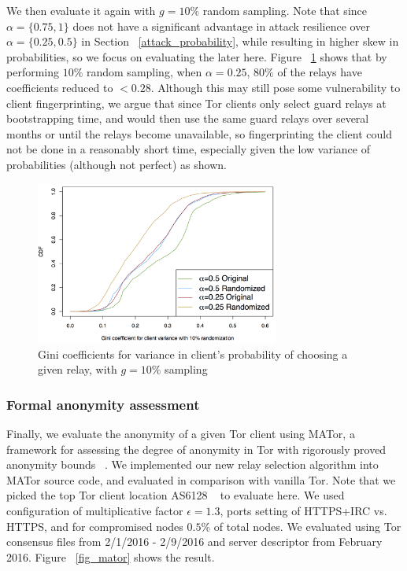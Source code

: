 We then evaluate it again with $g=10\%$ random sampling. Note that since $\alpha=\{0.75,1\}$ does not have a significant advantage in attack resilience over $\alpha=\{0.25,0.5\}$ in Section ~\ref{attack_probability}, while resulting in higher skew in probabilities, so we focus on evaluating the later here. Figure ~\ref{fig_gini_client_random} shows that by performing $10\%$ random sampling, when $\alpha=0.25$, $80\%$ of the relays have coefficients reduced to $< 0.28$. Although this may still pose some vulnerability to client fingerprinting, we argue that since Tor clients only select guard relays at bootstrapping time, and would then use the same guard relays over several months or until the relays become unavailable, so fingerprinting the client could not be done in a reasonably short time, especially given the low variance of probabilities (although not perfect) as shown.

\begin{figure}[ht!]
\centering
\includegraphics[width=80mm]{figure/randomize_client_gini}
\caption{Gini coefficients for variance in client's probability of choosing a given relay, with $g=10\%$ sampling \label{fig_gini_client_random}}
\end{figure}

\subsubsection{Formal anonymity assessment}
Finally, we evaluate the anonymity of a given Tor client using MATor, a framework for assessing the degree of anonymity in Tor with rigorously proved anonymity bounds ~\cite{backes2014nothing}. We implemented our new relay selection algorithm into MATor source code, and evaluated in comparison with vanilla Tor. Note that we picked the top Tor client location AS6128 ~\cite{juen2012protecting} to evaluate here. We used configuration of multiplicative factor $\epsilon=1.3$, ports setting of HTTPS+IRC vs. HTTPS, and for compromised nodes $0.5\%$ of total nodes. We evaluated using Tor consensus files from 2/1/2016 - 2/9/2016 and server descriptor from February 2016. Figure ~\ref{fig_mator} shows the result. 

